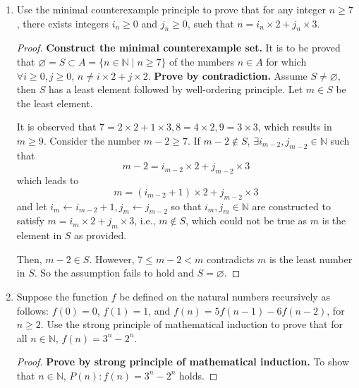 \documentclass[12pt,a4paper]{article}
\theoremstyle{definition}
\begin{document}
\begin{enumerate}
\begin{proof}
        As a result, The requested prime $p$ satisfying $n<p<n!$ is found and the proposition holds.
   \end{proof}

    \item
    Use the minimal counterexample principle to prove that for any integer $n\ge 7$, there exists integers $i_n\ge 0$ and $j_n\ge 0$, such that $n = i_n \times 2 + j_n \times 3$.
   \begin{proof}
       \textbf{Construct the minimal counterexample set.} It is to be proved that $\varnothing = S\subset A= \{n\in \mathbb{N}\mid n\geq 7\}$ of the numbers $n\in A$ for which $\forall i\geq 0, j \geq 0$, $n\neq i\times 2+j\times 2$. \textbf{Prove by contradiction.} Assume $S\neq \varnothing$, then $S$ has a least element followed by well-ordering principle. Let $m\in S$ be the least element.

       It is observed that $7=2\times 2 + 1\times 3, 8=4\times 2, 9=3 \times 3$, which results in $m\geq 9$. Consider the number $m-2\geq 7$. If $m-2\notin S$, $\exists i_{m-2}, j_{m-2}\in \mathbb{N}$ such that
       \begin{equation*}
           m-2=i_{m-2}\times 2+j_{m-2}\times 3
       \end{equation*} 
       which leads to
       \begin{equation*}
           m = \left(i_{m-2}+1\right)\times 2 + j_{m-2}\times 3
       \end{equation*}
       and let $i_m\leftarrow i_{m-2}+1, j_m\leftarrow j_{m-2}$ so that $i_m,j_m \in \mathbb{N}$ are constructed to satisfy $m=i_m\times 2+j_m\times 3$, i.e., $m\notin S$, which could not be true as $m$ is the element in $S$ as provided.

       Then, $m-2\in S$. However, $7\leq m-2<m$ contradicts $m$ is the least number in $S$. So the assumption fails to hold and $S=\varnothing$.
   \end{proof}

    \item
    Suppose the function $f$ be defined on the natural numbers recursively as follows: $f(0)=0$, $f(1)=1$, and $f(n)=5f(n-1)-6f(n-2)$, for $n\geq 2$. Use the strong principle of mathematical induction to prove that for all $n\in \mathbb{N}$, $f(n)=3^n-2^n$. 
   \begin{proof}
       \textbf{Prove by strong principle of mathematical induction.} To show that $n\in \mathbb{N}$, $P(n): f(n)=3^n-2^n$ holds.
       

\end{proof}
\end{enumerate}
\end{document}
